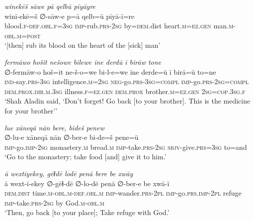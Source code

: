 \ea \label{DG.50}
\textit{winekēš sāwe pā qelbū pīyāyre} \\ 
\gll winī-ekē=š ∅-sāw-e p=ā qelb=ū pīyā-ī=re \\ 
 blood\textsc{\textsc{.f}}\textsc{-def}\textsc{.obl}\textsc{\textsc{.f}}\textsc{=3sg} \textsc{imp-}rub\textsc{.prs}-\textsc{2sg} by\textsc{=dem}.dist heart\textsc{.m}\textsc{=ez}\textsc{.gen} man\textsc{.m}\textsc{-obl}\textsc{.m}\textsc{=\textsc{post}} \\ 
\glt `[then] rub its blood on the heart of the [sick] man'
\z 
 
\ea \label{DG.56}
\textit{fermāwo hošit nešowe bilewe īne derdū ī birāw tone} \\ 
\gll ∅-fermāw-o hoš=it ne-š-o=we bi-l-e=we īne derde=ū ī birā=ū to=ne \\ 
 \textsc{ind-}say\textsc{.prs}\textsc{-3sg} intelligence\textsc{.m}\textsc{=\textsc{2sg}} \textsc{neg-}go\textsc{.prs}\textsc{-3sg}\textsc{=\textsc{compl}} \textsc{imp-}go\textsc{.prs}-\textsc{2sg}\textsc{=compl} \textsc{dem.prox}\textsc{.dir}\textsc{.m}\textsc{.3sg} illness\textsc{\textsc{.f}}\textsc{=ez}\textsc{.gen} \textsc{dem.prox} brother\textsc{.m}\textsc{=ez}\textsc{.gen} \textsc{2sg}\textsc{=cop}\textsc{.3sg}\textsc{\textsc{.f}} \\ 
\glt `Shah Aladin said, ‘Don’t forget! Go back [to your brother]. This is the medicine for your brother’'
\z 
 
\ea \label{DG.57}
\textit{lue xāneqā nān bere, bideš penew} \\ 
\gll ∅-lu-e xāneqā nān ∅-ber-e bi-de=š pene=ū \\ 
 \textsc{imp-}go.\textsc{imp-}\textsc{2sg} monastery\textsc{.m} bread\textsc{.m} \textsc{imp-}take\textsc{.prs}-\textsc{2sg} \textsc{sbjv-}give\textsc{.prs}\textsc{=3sg} to=and \\ 
\glt `Go to the monastery; take food [and] give it to him.'
\z 
 
\ea \label{DG.58}
\textit{ā wextīyekey, gēɫdē lodē penā bere be xwāy} \\ 
\gll ā wext-ī-ekey ∅-gēɫ-dē ∅-lo-dē penā ∅-ber-e be xwā-ī \\ 
 \textsc{dem.dist} time\textsc{.m}\textsc{-obl}\textsc{.m}\textsc{-def}\textsc{.obl}\textsc{.m} \textsc{imp-}wander\textsc{.prs}\textsc{-2pl} \textsc{imp-}go\textsc{.prs}\textsc{.imp}\textsc{-2pl} refuge \textsc{imp-}take\textsc{.prs}-\textsc{2sg} by God\textsc{.m}\textsc{-obl}\textsc{.m} \\ 
\glt `Then, go back [to your place]; Take refuge with God.'
\z 
 
